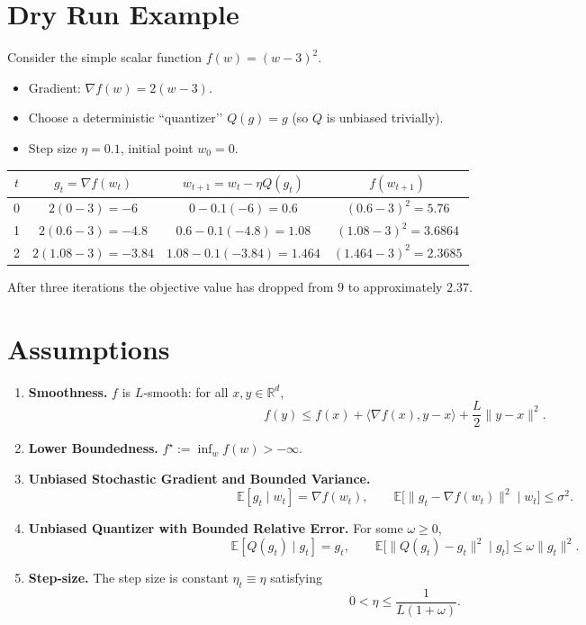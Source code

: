 \documentclass{article}
\begin{document}
\section*{Dry Run Example}
Consider the simple scalar function $f(w)=(w-3)^2$.
\begin{itemize}
    \item Gradient: $\nabla f(w)=2(w-3)$.
    \item Choose a deterministic “quantizer’’ $Q(g)=g$ (so $Q$ is unbiased trivially).
    \item Step size $\eta=0.1$, initial point $w_0=0$.
\end{itemize}
\begin{center}
\begin{tabular}{c|c|c|c}
$t$ & $g_t= \nabla f(w_t)$ & $w_{t+1}=w_t-\eta Q(g_t)$ & $f(w_{t+1})$\\ \hline
0 & $2(0-3)=-6$ & $0-0.1(-6)=0.6$ & $(0.6-3)^2=5.76$\\
1 & $2(0.6-3)=-4.8$ & $0.6-0.1(-4.8)=1.08$ & $(1.08-3)^2=3.6864$\\
2 & $2(1.08-3)=-3.84$ & $1.08-0.1(-3.84)=1.464$ & $(1.464-3)^2=2.3685$\\
\end{tabular}
\end{center}
After three iterations the objective value has dropped from $9$ to approximately $2.37$.

\newpage
\section*{Assumptions}
\begin{enumerate}[label={A\arabic*}]
    \item \textbf{Smoothness.} $f$ is $L$‑smooth: for all $x,y\in\mathbb{R}^d$,
    \[
    f(y)\le f(x)+\langle\nabla f(x),y-x\rangle+\frac{L}{2}\|y-x\|^2 .
    \tag{A1}
    \]
    \item \textbf{Lower Boundedness.} $f^\star:=\inf_{w}f(w)>-\infty$.
    \item \textbf{Unbiased Stochastic Gradient and Bounded Variance.}
    \[
    \mathbb{E}[g_t\mid w_t]=\nabla f(w_t),\qquad
    \mathbb{E}\!\big[\|g_t-\nabla f(w_t)\|^2\mid w_t\big]\le\sigma^2 .
    \tag{A2}
    \]
    \item \textbf{Unbiased Quantizer with Bounded Relative Error.} For some $\omega\ge0$,
    \[
    \mathbb{E}[Q(g_t)\mid g_t]=g_t,\qquad
    \mathbb{E}\!\big[\|Q(g_t)-g_t\|^2\mid g_t\big]\le\omega\|g_t\|^2 .
    \tag{A3}
    \]
    \item \textbf{Step‑size.} The step size is constant $\eta_t\equiv\eta$ satisfying
    \[
    0<\eta\le\frac{1}{L(1+\omega)} .
    \tag{A4}
    \]
\end{enumerate}
\end{document}
